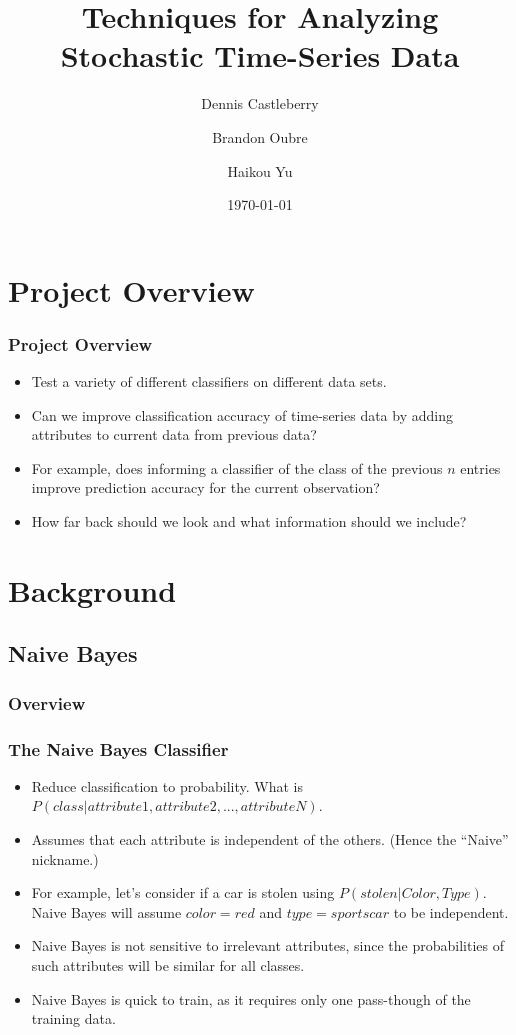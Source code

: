 \documentclass[mathserif]{beamer}
\begin{document}
	\title[Analyzing Stochastic Time-Series Data]{Techniques for Analyzing Stochastic Time-Series Data}
	\author[Castleberry \and Oubre \and Yu]{Dennis Castleberry \and Brandon Oubre \and Haikou Yu}
	\date{\today}
	\frame{\titlepage}
	
	\section{Project Overview}



	\begin{frame}
		\frametitle{Project Overview}
		\begin{itemize}
			\item Test a variety of different classifiers on different data sets.
			\item Can we improve classification accuracy of time-series data by adding attributes to current data from previous data?
			\item For example, does informing a classifier of the class of the previous \(n\) entries improve prediction accuracy for the current observation?
			\item How far back should we look and what information should we include?
		\end{itemize}
	\end{frame}


	
	\section{Background}
	\subsection{Naive Bayes}
	\subsubsection{Overview}
	\begin{frame}
		\frametitle{The Naive Bayes Classifier}
		\begin{itemize}
			\item Reduce classification to probability. What is \(P(class | attribute1, attribute2, ..., attributeN)\).
			\item Assumes that each attribute is independent of the others. (Hence the ``Naive'' nickname.)
			\item For example, let's consider if a car is stolen using \(P(stolen | Color, Type)\). Naive Bayes will assume \(color=red\) and \(type=sportscar\) to be independent.
			\item Naive Bayes is not sensitive to irrelevant attributes, since the probabilities of such attributes will be similar for all classes.
			\item Naive Bayes is quick to train, as it requires only one pass-though of the training data.
		\end{itemize}
	\end{frame}
	
\end{document}
